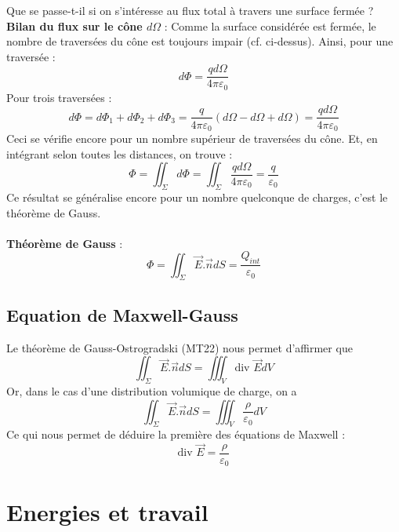 Que se passe-t-il si on s'intéresse au flux total à travers une surface fermée ?
\noindent\textbf{Bilan du flux sur le cône $d\Omega$} : Comme la surface considérée est fermée, le nombre de traversées du cône est toujours impair (cf. ci-dessus). Ainsi, pour une traversée : \[ d\Phi=\frac{qd\Omega}{4\pi\varepsilon_0} \]
Pour trois traversées : \[ d\Phi=d\Phi_1+d\Phi_2+d\Phi_3=\frac{q}{4\pi\varepsilon_0}(d\Omega-d\Omega+d\Omega)=\frac{qd\Omega}{4\pi\varepsilon_0} \]
Ceci se vérifie encore pour un nombre supérieur de traversées du cône. Et, en intégrant selon toutes les distances, on trouve :
\[ \Phi=\iint_\Sigma d\Phi=\iint_\Sigma\frac{qd\Omega}{4\pi\varepsilon_0}=\frac{q}{\varepsilon_0} \]
Ce résultat se généralise encore pour un nombre quelconque de charges, c'est le théorème de Gauss.\\\\
\noindent\textbf{Théorème de Gauss} : \[ \Phi=\iint_\Sigma\vec{E}.\vec{n} dS=\frac{Q_{int}}{\varepsilon_0}\]

\subsection{Equation de Maxwell-Gauss}

Le théorème de Gauss-Ostrogradski (MT22) nous permet d'affirmer que 
\[ \iint_\Sigma\vec{E}.\vec{n}dS=\iiint_V\textrm{div }\vec{E}dV \]
Or, dans le cas d'une distribution volumique de charge, on a
\[ \iint_\Sigma\vec{E}.\vec{n}dS=\iiint_V\frac{\rho}{\varepsilon_0}dV \]
Ce qui nous permet de déduire la première des équations de Maxwell :
\[ \textrm{div }\vec{E}=\frac{\rho}{\varepsilon_0} \]


\section{Energies et travail}
